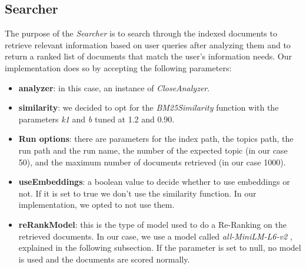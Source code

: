 \subsection{Searcher} \label{searcher_subsec}
The purpose of the \textit{Searcher} is to search through the indexed documents to retrieve relevant information based on user queries after analyzing them and to
return a ranked list of documents that match the user’s information needs.
\newline
Our implementation does so by accepting the following parameters:
\begin{itemize}
  \item \textbf{analyzer}: in this case, an instance of \textit{CloseAnalyzer}.
  \item \textbf{similarity}: we decided to opt for the \textit{BM25Similarity} \cite{lucenebm25similarity} function with the parameters \textit{k1} and \textit{b} tuned at 1.2 and 0.90.
  \item \textbf{Run options}: there are parameters for the index path, the topics path, the run path and the run name, the number of the expected topic (in our case 50), and the maximum number of documents retrieved (in our case 1000).
  \item \textbf{useEmbeddings}: a boolean value to decide whether to use embeddings or not. 
  If it is set to true we don't use the similarity function. In our implementation, we opted to not use them.
  \item \textbf{reRankModel}: this is the type of model used to do a Re-Ranking on the retrieved documents. 
  In our case, we use a model called \textit{all-MiniLM-L6-v2} \cite{huggingfaceallminilml6v2}, explained in the following subsection. 
  If the parameter is set to null, no model is used and the documents are scored normally.
\end{itemize}


